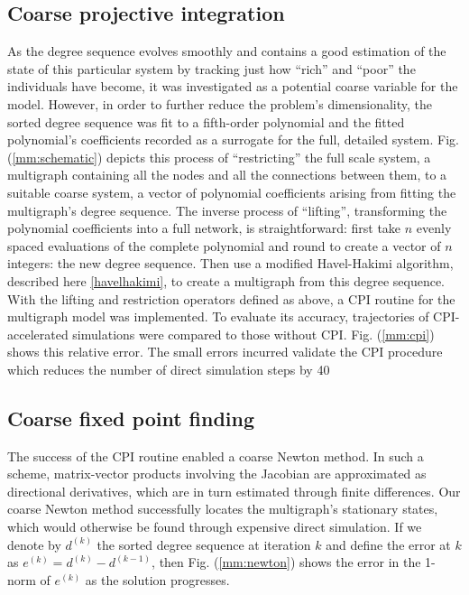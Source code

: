 \documentclass[12pt]{article}
\begin{document}
\subsection{Coarse projective integration}
As the degree sequence evolves smoothly and contains a good estimation of the state of this particular system by tracking just how ``rich'' and ``poor'' the individuals have become, it was investigated as a potential coarse variable for the model. However, in order to further reduce the problem's dimensionality, the sorted degree sequence was fit to a fifth-order polynomial and the fitted polynomial's coefficients recorded as a surrogate for the full, detailed system. Fig. (\ref{mm:schematic}) depicts this process of ``restricting'' the full scale system, a multigraph containing all the nodes and all the connections between them, to a suitable coarse system, a vector of polynomial coefficients arising from fitting the multigraph's degree sequence. The inverse process of ``lifting'', transforming the polynomial coefficients into a full network, is straightforward: first take $n$ evenly spaced evaluations of the complete polynomial and round to create a vector of $n$ integers: the new degree sequence. Then use a modified Havel-Hakimi algorithm, described here \ref{havelhakimi}, to create a multigraph from this degree sequence. \\
With the lifting and restriction operators defined as above, a CPI routine for the multigraph model was implemented. To evaluate its accuracy, trajectories of CPI-accelerated simulations were compared to those without CPI. Fig. (\ref{mm:cpi}) shows this relative error. The small errors incurred validate the CPI procedure which reduces the number of direct simulation steps by 40%
\subsection{Coarse fixed point finding}
The success of the CPI routine enabled a coarse Newton method. In such a scheme, matrix-vector products involving the Jacobian are approximated as directional derivatives, which are in turn estimated through finite differences. Our coarse Newton method successfully locates the multigraph's stationary states, which would otherwise be found through expensive direct simulation. If we denote by $d^{(k)}$ the sorted degree sequence at iteration $k$ and define the error at $k$ as $e^{(k)} = d^{(k)} - d^{(k-1)}$, then Fig. (\ref{mm:newton}) shows the error in the 1-norm of $e^{(k)}$ as the solution progresses.
\end{document}
